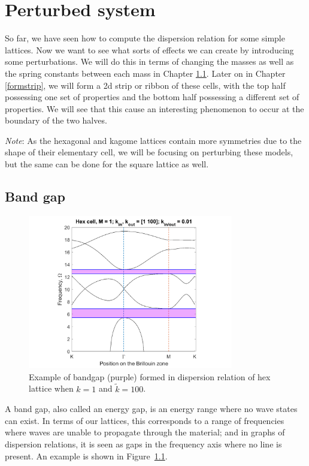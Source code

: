 \chapter{Perturbed system}
\label{perturbed}

So far, we have seen how to compute the dispersion relation for some simple
lattices. Now we want to see what sorts of effects we can create by introducing
some perturbations. We will do this in terms of changing the masses as well as
the spring constants between each mass in Chapter \ref{formbandgap}. Later on
in Chapter \ref{formstrip}, we will form a 2d strip or ribbon of these cells,
with the top half possessing one set of properties and the bottom half
possessing a different set of properties. We will see that this cause an
interesting phenomenon to occur at the boundary of the two halves.

\textit{Note}: As the hexagonal and kagome lattices contain more symmetries due
to the shape of their elementary cell, we will be focusing on perturbing these
models, but the same can be done for the square lattice as well. 

\section{Band gap}
\label{formbandgap}

\begin{figure}[!h]
\centering
\includegraphics[width=0.8\textwidth]{imgs/bandgapex.png}
\caption{\label{fig:bandgapex} Example of bandgap (purple) formed in dispersion
  relation of hex lattice when $k=1$ and $\tilde{k}=100$.}
\end{figure}

A band gap, also called an energy gap, is an energy range where no wave states
can exist. In terms of our lattices, this corresponds to a range of frequencies
where waves are unable to propagate through the material; and in graphs of
dispersion relations, it is seen as gaps in the frequency axis where no line
is present. An example is shown in Figure~\ref{fig:bandgapex}. 



